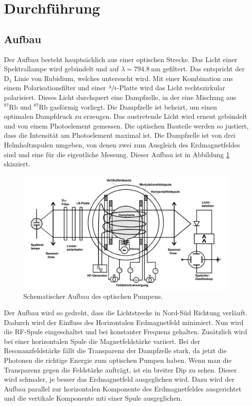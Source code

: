 \section{Durchführung}
\subsection{Aufbau}
\label{sec:Durchführung}
Der Aufbau besteht hauptsächlich aus einer optischen Strecke. Das Licht einer Spektrallampe wird gebündelt und auf $\lambda = \SI{794,8}{\nano \meter}$
gefiltert. Das entspricht der $\text{D}_1$ Linie von Rubidium, welches untersucht wird. Mit einer Kombination aus einem Polarisationsfilter und einer
$\sfrac{\lambda}{4}$-Platte wird das Licht rechtszirkular polarisiert. Dieses Licht durchquert eine Dampfzelle, in der eine Mischung aus ${}^{87}\text{Rb}$
und ${}^{87}\text{Rb}$ gasförmig vorliegt. Die Dampfzelle ist beheizt, um einen optimalen Dampfdruck zu erzeugen. Das austretende Licht wird erneut gebündelt
und von einem Photoelement gemessen. Die optischen Bauteile werden so justiert, dass die Intensität am Photoelement maximal ist. Die Dampfzelle ist von drei Helmholtzspulen umgeben, von denen zwei zum Ausgleich des Erdmagnetfeldes sind und eine für
die eigentliche Messung. Dieser Aufbau ist in Abbildung \ref{fig:aufbaucom} skizziert.
\begin{figure}
	\centering
	\includegraphics[width=0.8\linewidth]{img/aufbaucom.jpg}
	\caption{Schematischer Aufbau des optischen Pumpens.\cite{V21}}
	\label{fig:aufbaucom}
\end{figure}
Der Aufbau wird so gedreht, dass die Lichtstrecke in Nord-Süd Richtung verläuft. Dadurch wird der Einfluss des Horizontalen Erdmagnetfeld minimiert.
Nun wird die RF-Spule eingeschaltet und bei konstanter Frequenz gehalten. Zusätzlich wird bei einer horizontalen Spule die Magnetfeldstärke variiert. Bei der
Resonanzfeldstärke fällt die Transparenz der Dampfzelle stark, da jetzt die Photonen die richtige Energie zum optischen Pumpen haben. Wenn man die Transparenz
gegen die Feldstärke aufträgt, ist ein breiter Dip zu sehen. Dieser wird schmaler, je besser das Erdmagnetfeld ausgeglichen wird. Dazu wird der Aufbau parallel zur horizontalen Komponente des Erdmagnetfeldes ausgerichtet und die vertikale Komponente mti einer Spule ausgeglichen.
